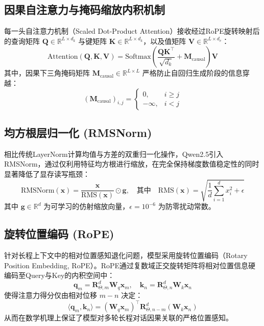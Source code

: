 \documentclass[UTF8,a4paper,zihao=-4,openany,twoside]{ctexbook}
\begin{document}
\subsection{因果自注意力与掩码缩放内积机制}
每一头自注意力机制（Scaled Dot-Product Attention）接收经过RoPE旋转映射后的查询矩阵 $\mathbf{Q} \in \mathbb{R}^{L \times d_k}$ 与键矩阵 $\mathbf{K} \in \mathbb{R}^{L \times d_k}$，以及值矩阵 $\mathbf{V} \in \mathbb{R}^{L \times d_v}$：
\begin{equation}
\text{Attention}(\mathbf{Q}, \mathbf{K}, \mathbf{V}) = \text{Softmax}\left( \frac{\mathbf{Q} \mathbf{K}^\top}{\sqrt{d_k}} + \mathbf{M}_{\text{causal}} \right) \mathbf{V}
\label{eq:causal_attn}
\end{equation}
其中，因果下三角掩码矩阵 $\mathbf{M}_{\text{causal}} \in \mathbb{R}^{L \times L}$ 严格防止自回归生成阶段的信息穿越：
\begin{equation}
(\mathbf{M}_{\text{causal}})_{i, j} = \begin{cases}
0, & i \ge j \\
-\infty, & i < j
\end{cases}
\label{eq:causal_mask}
\end{equation}

\subsection{均方根层归一化 (RMSNorm)}
相比传统LayerNorm计算均值与方差的双重归一化操作，Qwen2.5引入RMSNorm\cite{zhang2019root}，通过仅利用特征均方根进行缩放，在完全保持梯度数值稳定性的同时显著降低了显存读写瓶颈：
\begin{equation}
\text{RMSNorm}(\mathbf{x}) = \frac{\mathbf{x}}{\text{RMS}(\mathbf{x})} \odot \mathbf{g}, \quad \text{其中} \quad \text{RMS}(\mathbf{x}) = \sqrt{\frac{1}{d} \sum_{i=1}^d x_i^2 + \epsilon}
\label{eq:rmsnorm}
\end{equation}
其中 $\mathbf{g} \in \mathbb{R}^d$ 为可学习的仿射缩放向量，$\epsilon = 10^{-6}$ 为防零扰动常数。

\subsection{旋转位置编码 (RoPE)}
针对长程上下文中的相对位置感知退化问题，模型采用旋转位置编码（Rotary Position Embedding, RoPE）\cite{su2024roformer}。RoPE通过复数域正交旋转矩阵将相对位置信息硬编码至Query与Key的内积空间中：
\begin{equation}
\mathbf{q}_m = \mathbf{R}_{\Theta, m}^d \mathbf{W}_q \mathbf{x}_m, \quad \mathbf{k}_n = \mathbf{R}_{\Theta, n}^d \mathbf{W}_k \mathbf{x}_n
\label{eq:rope_transform}
\end{equation}
使得注意力得分仅由相对位移 $m-n$ 决定：
\begin{equation}
\langle \mathbf{q}_m, \mathbf{k}_n \rangle = (\mathbf{W}_q \mathbf{x}_m)^\top \mathbf{R}_{\Theta, n-m}^d (\mathbf{W}_k \mathbf{x}_n)
\label{eq:rope_inner_product}
\end{equation}
从而在数学机理上保证了模型对多轮长程对话因果关联的严格位置感知。
\end{document}
